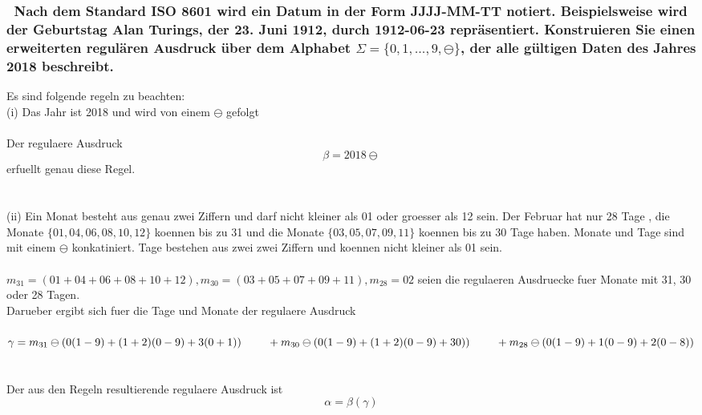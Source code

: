 \documentclass{article}
\newcommand{\tab}{\null\ \qquad}
\newcommand{\gap}{\null\ \\ \\}
\begin{document}
\subsubsection{\
    Nach dem Standard ISO 8601 wird ein Datum in der Form JJJJ-MM-TT notiert.
        Beispielsweise wird der Geburtstag Alan Turings, der 23. Juni 1912, 
        durch 1912-06-23 repräsentiert. Konstruieren Sie einen erweiterten 
        regulären Ausdruck über dem Alphabet $\Sigma = \{0,1,...,9, \ominus\}$,
        der alle gültigen Daten des Jahres 2018 beschreibt.
    }
Es sind folgende regeln zu beachten:\\
(i) Das Jahr ist 2018 und wird von einem $\ominus$ gefolgt\\
\\
Der regulaere Ausdruck\[
    \beta = 2018 \ominus
    \]
erfuellt genau diese Regel.\\
\gap
(ii) Ein Monat besteht aus genau zwei Ziffern und darf nicht kleiner als 01 oder
    groesser als 12 sein. Der Februar hat nur 28 Tage
    , die Monate $\{01,04,06,08,10,12\}$ koennen bis zu 31 
    und die Monate $\{03,05,07,09,11\}$ koennen bis zu 30 Tage haben.
    Monate und Tage sind mit einem $\ominus$ konkatiniert.
    Tage bestehen aus zwei zwei Ziffern und koennen nicht kleiner als 01 sein.\\
\\
$m_{31} = (01+04+06+08+10+12), m_{30} = (03+05+07+09+11), m_{28} = 02$ seien die
    regulaeren Ausdruecke fuer Monate mit 31, 30 oder 28 Tagen.\\
Darueber ergibt sich fuer die Tage und Monate der regulaere Ausdruck\\
\\
$\gamma = m_{31} \ominus (0(1-9)+(1+2)(0-9)+3(0+1))\\
    \tab + m_{30} \ominus (0(1-9)+(1+2)(0-9)+30))\\
    \tab + m_{28} \ominus (0(1-9)+1(0-9)+2(0-8))
    $\\
\gap
Der aus den Regeln resultierende regulaere Ausdruck ist\[
    \alpha = \beta (\gamma)
    \]
\end{document}

